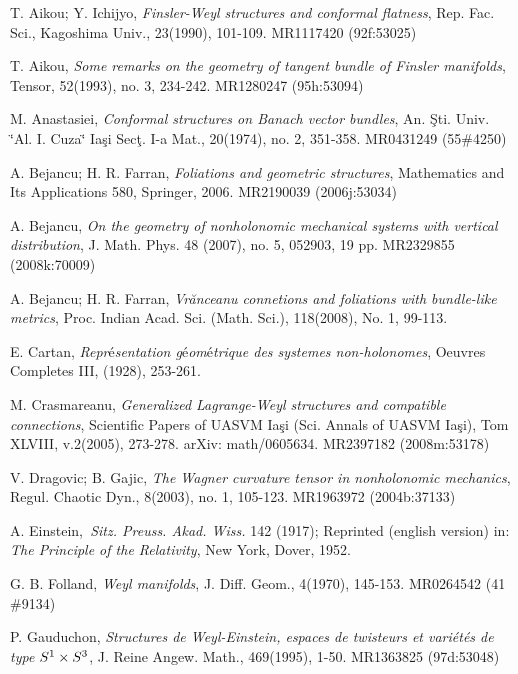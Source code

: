 \documentclass[11pt,oneside,english]{amsart}
\numberwithin{equation}{section}
\numberwithin{figure}{section}
\theoremstyle{plain}
\theoremstyle{definition}
\theoremstyle{definition}
\theoremstyle{plain}
\theoremstyle{plain}
\theoremstyle{remark}
\theoremstyle{remark}
\begin{document}
\medskip{}

\begin{thebibliography}{10}
 T. Aikou; Y. Ichijyo, \textit{Finsler-Weyl structures
and conformal flatness}, Rep. Fac. Sci., Kagoshima Univ., 23(1990),
101-109. MR1117420 (92f:53025)

 T. Aikou, \textit{Some remarks on the geometry of tangent
bundle of Finsler manifolds}, Tensor, 52(1993), no. 3, 234-242. MR1280247
(95h:53094)

 M. Anastasiei, \textit{Conformal structures on Banach
vector bundles}, An. \c{S}ti. Univ. \char`\"{}Al. I. Cuza\char`\"{}
Ia\c{s}i Sec\c{t}. I-a Mat., 20(1974), no. 2, 351-358. MR0431249 (55\#4250)

 A. Bejancu; H. R. Farran, \textit{Foliations and geometric
structures}, Ma\-the\-ma\-tics and Its Applications 580, Springer,
2006. MR2190039 (2006j:53034)

 A. Bejancu, \emph{On the geometry of nonholonomic
mechanical systems with vertical distribution}, J. Math. Phys. 48
(2007), no. 5, 052903, 19 pp. MR2329855 (2008k:70009)

 A. Bejancu; H. R. Farran, \textit{Vr\u{a}nceanu
connetions and foliations with bundle-like metrics}, Proc. Indian
Acad. Sci. (Math. Sci.), 118(2008), No. 1, 99-113.

 E. Cartan, \emph{Repr$\text{\'e}$sentation g$\text{\'e}$om$\text{\'e}$trique
des systemes non-holonomes}, Oeuvres Completes III, (1928), 253-261. 

 M. Crasmareanu, \textit{Generalized Lagrange-Weyl
structures and com\-pa\-ti\-ble connections}, Scientific Papers
of UASVM Ia\c{s}i (Sci. Annals of UASVM Ia\c{s}i), Tom XLVIII, v.2(2005),
273-278. arXiv: math/0605634. MR2397182 (2008m:53178)

 V. Dragovic; B. Gajic, \emph{The Wagner curvature
tensor in nonholonomic mechanics}, Regul. Chaotic Dyn., 8(2003), no.
1, 105-123. MR1963972 (2004b:37133)

 A. Einstein,\textit{\ Sitz. Preuss. Akad.
Wiss.} 142 (1917); Reprinted (english version) in: \textit{The Principle
of the Relativity}, New York, Dover, 1952.

 G. B. Folland, \textit{Weyl manifolds}, J. Diff.
Geom., 4(1970), 145-153. MR0264542 (41 \#9134)

 P. Gauduchon, \textit{Structures de Weyl-Einstein,
espaces de twisteurs et variétés de type $S\sp1\times S\sp3$}, J.
Reine Angew. Math., 469(1995), 1-50. MR1363825 (97d:53048)


\end{thebibliography}
\end{document}
